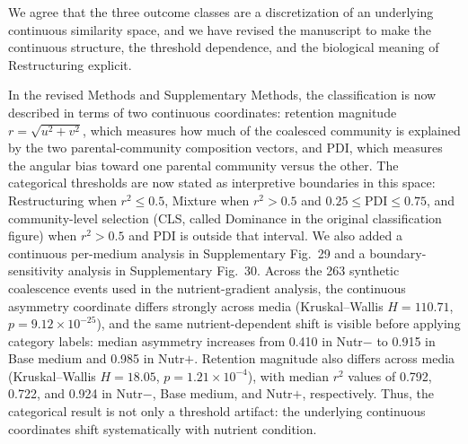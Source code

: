 
\responselabel We agree that the three outcome classes are a discretization of an underlying continuous similarity space, and we have revised the manuscript to make the continuous structure, the threshold dependence, and the biological meaning of Restructuring explicit.

In the revised Methods and Supplementary Methods, the classification is now described in terms of two continuous coordinates: retention magnitude $r = \sqrt{u^2+v^2}$, which measures how much of the coalesced community is explained by the two parental-community composition vectors, and PDI, which measures the angular bias toward one parental community versus the other. The categorical thresholds are now stated as interpretive boundaries in this space: Restructuring when $r^2 \leq 0.5$, Mixture when $r^2 > 0.5$ and $0.25 \leq \mathrm{PDI} \leq 0.75$, and community-level selection (CLS, called Dominance in the original classification figure) when $r^2 > 0.5$ and PDI is outside that interval. We also added a continuous per-medium analysis in Supplementary Fig.~29 and a boundary-sensitivity analysis in Supplementary Fig.~30. Across the 263 synthetic coalescence events used in the nutrient-gradient analysis, the continuous asymmetry coordinate differs strongly across media (Kruskal--Wallis $H = 110.71$, $p = 9.12 \times 10^{-25}$), and the same nutrient-dependent shift is visible before applying category labels: median asymmetry increases from 0.410 in Nutr$-$ to 0.915 in Base medium and 0.985 in Nutr$+$. Retention magnitude also differs across media (Kruskal--Wallis $H = 18.05$, $p = 1.21 \times 10^{-4}$), with median $r^2$ values of 0.792, 0.722, and 0.924 in Nutr$-$, Base medium, and Nutr$+$, respectively. Thus, the categorical result is not only a threshold artifact: the underlying continuous coordinates shift systematically with nutrient condition.


